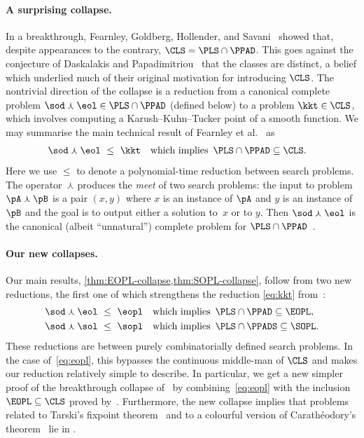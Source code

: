 \paragraph{A surprising collapse.}
In a breakthrough, Fearnley, Goldberg, Hollender, and Savani~\cite{Fearnley2021} showed that, despite appearances to the contrary, $\CLS=\PLS\cap\PPAD$.  This goes against the conjecture of Daskalakis and Papadimitriou~\cite{Daskalakis2011} that the classes are distinct, a belief which underlied much of their original motivation for introducing $\CLS$. The nontrivial direction of the collapse is a reduction from a canonical complete problem $\sod\curlywedge\eol\in \PLS\cap\PPAD$ (defined below) to a problem $\kkt\in\CLS$, which involves computing a Karush--Kuhn--Tucker point of a smooth function. We may summarise the main technical result of Fearnley et al.~\cite{Fearnley2021} as
\begin{align} \label{eq:kkt}
\sod\curlywedge\eol &~\leq~ \kkt
&&\text{which implies}\enspace \PLS\cap\PPAD\subseteq\CLS.
\end{align}
Here we use $\leq$ to denote a polynomial-time reduction between search problems. The operator~$\curlywedge$ produces the \emph{meet} of two search problems: the input to problem $\pA\curlywedge\pB$ is a pair $(x,y)$ where $x$ is an instance of $\pA$ and $y$ is an instance of $\pB$ and the goal is to output either a solution to~$x$ or to $y$. Then $\sod\curlywedge\eol$ is the canonical (albeit ``unnatural'') complete problem for $\PLS\cap\PPAD$~\cite{Daskalakis2011}.


\paragraph{Our new collapses.}
Our main results, \cref{thm:EOPL-collapse,thm:SOPL-collapse}, follow from two new reductions, the first one of which strengthens the reduction \cref{eq:kkt} from~\cite{Fearnley2021}:
\begin{align} 
\sod\curlywedge\eol &~\leq~ \eopl
&&\text{which implies}\enspace \PLS\cap\PPAD\subseteq\EOPL,
\label{eq:eopl} \\
\sod\curlywedge\sol &~\leq~ \sopl
&&\text{which implies}\enspace \PLS\cap\PPADS\subseteq\SOPL.
\end{align}
These reductions are between purely combinatorially defined search problems. In the case of~\cref{eq:eopl}, this bypasses the continuous middle-man of $\CLS$ and makes our reduction relatively simple to describe. In particular, we get a new simpler proof of the breakthrough collapse of~\cite{Fearnley2021} by combining~\cref{eq:eopl} with the inclusion $\EOPL\subseteq\CLS$ proved by~\cite{Hubacek2020}. Furthermore, the new collapse implies that problems related to Tarski's fixpoint theorem~\cite{Etessami2020} and to a colourful version of Carath{\'e}odory's theorem~\cite{Meunier2017} lie in \EOPL.



